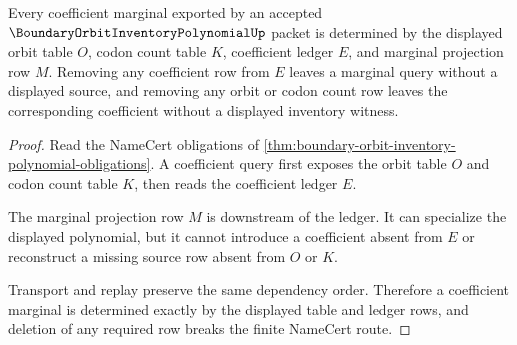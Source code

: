 \begin{theorem}
\label{thm:boundary-orbit-inventory-coefficient-determinacy}
Every coefficient marginal exported by an accepted $\BoundaryOrbitInventoryPolynomialUp$ packet is determined by the displayed orbit table $O$, codon count table $K$, coefficient ledger $E$, and marginal projection row $M$. Removing any coefficient row from $E$ leaves a marginal query without a displayed source, and removing any orbit or codon count row leaves the corresponding coefficient without a displayed inventory witness.
\end{theorem}
\begin{proof}
Read the NameCert obligations of \autoref{thm:boundary-orbit-inventory-polynomial-obligations}. A coefficient query first exposes the orbit table $O$ and codon count table $K$, then reads the coefficient ledger $E$.

The marginal projection row $M$ is downstream of the ledger. It can specialize the displayed polynomial, but it cannot introduce a coefficient absent from $E$ or reconstruct a missing source row absent from $O$ or $K$.

Transport and replay preserve the same dependency order. Therefore a coefficient marginal is determined exactly by the displayed table and ledger rows, and deletion of any required row breaks the finite NameCert route.
\end{proof}




